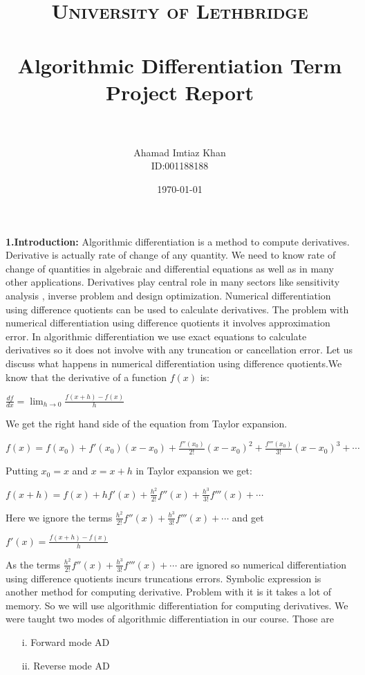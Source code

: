 \documentclass[paper=letter, fontsize=12pt]{scrartcl} %
\title{	
\normalfont \normalsize 
\textsc{University of Lethbridge} \\ [25pt] %
\horrule{0.5pt} \\[0.4cm] %
\huge Algorithmic Differentiation Term Project Report\\ %
\horrule{2pt} \\[0.5cm] %
}
\author{Ahamad Imtiaz Khan\\ID:001188188} %
\date{\normalsize\today} %
\begin{document}
\maketitle %


\Large \textbf{1.Introduction:}
\newline
\normalsize Algorithmic differentiation is a method to compute derivatives. Derivative is actually rate of change of any quantity. We need to know rate of change of quantities in algebraic and differential equations as well as in many other applications. Derivatives play central role in many sectors like sensitivity analysis , inverse problem and design optimization. Numerical differentiation using difference quotients can be used to calculate derivatives. The problem with numerical differentiation using difference quotients it involves approximation error. In algorithmic differentiation we use exact equations to calculate derivatives so it does not involve with any truncation or cancellation error. Let us discuss what happens in numerical differentiation using difference quotients.We know that the derivative of a function $f(x)$ is:
\begin{center}
 $\frac{df}{dx} = \lim_{h \to 0}\frac{f(x+h) - f(x)}{h}$
\end{center}
We get the right hand side of the equation from Taylor expansion.
\begin{center}
$f(x) = f(x_0)+f'(x_0)(x-x_0)+\frac{f''(x_0)}{2!}(x-x_0)^2+ \frac{f'''(x_0)}{3!}(x-x_0)^3+\cdots$
\end{center}  
Putting $x_0 = x$ and $x = x+h$ in Taylor expansion we get:
\begin{center}
$f(x + h) = f(x) + hf'(x) + \frac{h^2}{2!}f''(x) + \frac{h^3}{3!}f'''(x) + \cdots$
\end{center}
Here we ignore the terms $ \frac{h^2}{2!}f''(x) + \frac{h^3}{3!}f'''(x) + \cdots$ and get
\begin{center}
$f'(x) = \frac{f(x+h) - f(x)}{h}$
\end{center}
As the terms $ \frac{h^2}{2!}f''(x) + \frac{h^3}{3!}f'''(x) + \cdots$ are ignored so numerical differentiation using difference quotients incurs truncations errors.
Symbolic expression is another method for computing derivative. Problem with it is it takes a lot of memory. So we will use algorithmic differentiation for computing derivatives. We were taught two modes of algorithmic differentiation in our course. Those are 
\begin{enumerate} [align=left,style=nextline,leftmargin=1.5cm,labelsep=\parindent,font=\normalfont]
\item[i.] Forward mode AD
\item[ii.] Reverse mode AD
\end{enumerate}
\end{document}

